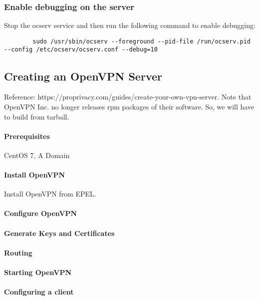 \documentclass{article}
\begin{document}
	\subsubsection{Enable debugging on the server}
	 Stop the ocserv service and then run the following command to enable debugging: 
	 \begin{verbatim}
	 	sudo /usr/sbin/ocserv --foreground --pid-file /run/ocserv.pid --config /etc/ocserv/ocserv.conf --debug=10
	 \end{verbatim}
	



\subsection{Creating an OpenVPN Server}
Reference: https://proprivacy.com/guides/create-your-own-vpn-server. Note that OpenVPN Inc. no longer releases rpm packages of their software. So, we will have to build from tarball.
\paragraph{Prerequisites}
CentOS 7, A Domain

\paragraph{Install OpenVPN}

Install OpenVPN from EPEL.

\paragraph{Configure OpenVPN}

\paragraph{Generate Keys and Certificates}

\paragraph{Routing}

\paragraph{Starting OpenVPN}

\paragraph{Configuring a client}
\end{document}

